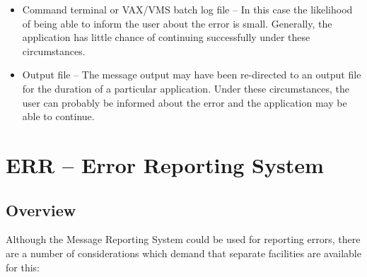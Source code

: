 \documentclass[twoside,11pt]{article}
\newcommand{\xlabel}[1]{}
\renewcommand{\_}{\texttt{\symbol{95}}}
\begin{document}
\begin {itemize}
\begin {itemize}
\item Command terminal or VAX/VMS batch log file -- 
In this case the likelihood of being able to inform the user about the error
is small.
Generally, the application has little chance of continuing successfully under
these circumstances.

\item Output file -- 
The message output may have been re-directed to an output file for the
duration of a particular application. 
Under these circumstances, the user can probably be informed about the error
and the application may be able to continue.
\end {itemize}
\end {itemize}


\section{\xlabel{err_error_reporting_system}ERR -- Error Reporting System \xlabel{err}}

\subsection{\xlabel{overview}Overview}

Although the Message Reporting System could be used for reporting errors, there
are a number of considerations which demand that separate facilities are
available for this:
\end{document}
